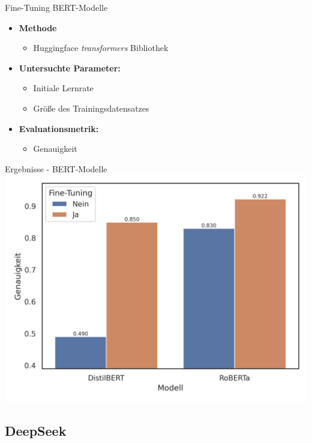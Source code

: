 \documentclass[aspectratio=169]{beamer} %
\begin{document}
\begin{frame}{Fine-Tuning BERT-Modelle}
\begin{itemize}
        \item \textbf{Methode}
            \begin{itemize}
                \item Huggingface \textit{transformers} Bibliothek
            \end{itemize}
        \item \textbf{Untersuchte Parameter:}
        \begin{itemize}
            \item Initiale Lernrate
            \item Größe des Trainingsdatensatzes
        \end{itemize}
        \item \textbf{Evaluationsmetrik:}
        \begin{itemize}
            \item Genauigkeit
        \end{itemize}
\end{itemize}
\end{frame}

\begin{frame}{Ergebnisse - BERT-Modelle}
    \centering
     \includegraphics[scale=0.65]{../datasets/sentiment140/results/plots/bert-based-genauigkeit-bert-basierte-modelle-default-vs.-fine-tuned-truncated-y-axis.png}
\end{frame}


\subsection{DeepSeek}
\end{document}
